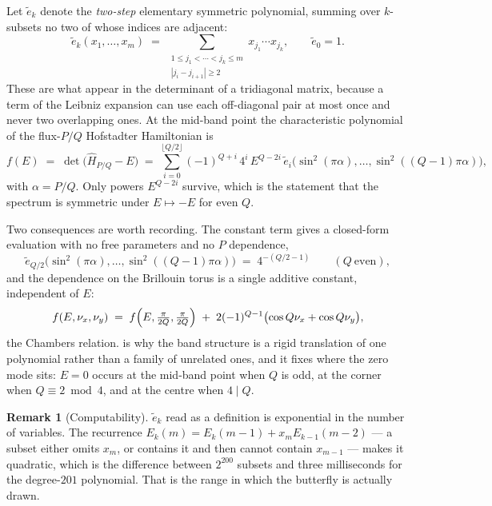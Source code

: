 \documentclass[11pt,a4paper]{article}
\theoremstyle{definition}
\newtheorem{remark}{Remark}
\begin{document}
Let $\tilde e_k$ denote the \emph{two-step} elementary symmetric polynomial,
summing over $k$-subsets no two of whose indices are adjacent:
%
\begin{equation}
\tilde e_k(x_1,\dots,x_m)
\;=\;
\sum_{\substack{1 \le j_1 < \cdots < j_k \le m \\ |j_i - j_{i+1}| \ge 2}}
x_{j_1} \cdots x_{j_k} ,
\qquad \tilde e_0 = 1 .
\end{equation}
%
These are what appear in the determinant of a tridiagonal matrix, because a
term of the Leibniz expansion can use each off-diagonal pair at most once and
never two overlapping ones. At the mid-band point the characteristic
polynomial of the flux-$P/Q$ Hofstadter Hamiltonian is
%
\begin{equation}
f(E) \;=\; \det\bigl(\hat H_{P/Q} - E\bigr)
\;=\;
\sum_{i=0}^{\lfloor Q/2 \rfloor} (-1)^{Q+i}\, 4^i\, E^{Q-2i}\,
\tilde e_i\bigl(\sin^2(\pi\alpha), \dots, \sin^2((Q-1)\pi\alpha)\bigr),
\label{eq:hofstadterpoly}
\end{equation}
%
with $\alpha = P/Q$. Only powers $E^{Q-2i}$ survive, which is the statement
that the spectrum is symmetric under $E \mapsto -E$ for even $Q$.

Two consequences are worth recording. The constant term gives a closed-form
evaluation with no free parameters and no $P$ dependence,
%
\begin{equation}
\tilde e_{Q/2}\bigl(\sin^2(\pi\alpha), \dots, \sin^2((Q-1)\pi\alpha)\bigr)
\;=\; 4^{-(Q/2 - 1)}
\qquad (Q \ \text{even}),
\label{eq:etildeidentity}
\end{equation}
%
and the dependence on the Brillouin torus is a single additive constant,
independent of $E$:
%
\begin{equation}
f(E, \nu_x, \nu_y) \;=\;
f\Bigl(E, \tfrac{\pi}{2Q}, \tfrac{\pi}{2Q}\Bigr)
\;+\; 2(-1)^{Q-1}\bigl(\cos Q\nu_x + \cos Q\nu_y\bigr) ,
\label{eq:chambers}
\end{equation}
%
the Chambers relation.  is why the band structure is a rigid
translation of one polynomial rather than a family of unrelated ones, and it
fixes where the zero mode sits: $E = 0$ occurs at the mid-band point when $Q$ is
odd, at the corner when $Q \equiv 2 \bmod 4$, and at the centre when
$4 \mid Q$.

\begin{remark}[Computability]
$\tilde e_k$ read as a definition is exponential in the number of variables.
The recurrence $E_k(m) = E_k(m-1) + x_m E_{k-1}(m-2)$ --- a subset either omits
$x_m$, or contains it and then cannot contain $x_{m-1}$ --- makes it quadratic,
which is the difference between $2^{200}$ subsets and three milliseconds for
the degree-$201$ polynomial. That is the range in which the butterfly is
actually drawn.
\end{remark}
\end{document}
